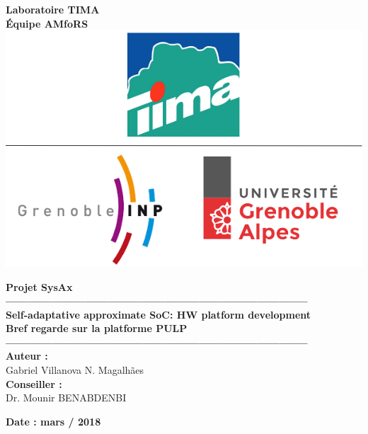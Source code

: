 \begin{titlepage}
\begin{center}
\textbf{\Large Laboratoire TIMA}\\[0.3cm] 
\textbf{\large Équipe AMfoRS}\\[0.1cm]
\vspace{20pt}
\includegraphics[scale=0.4]{../images/capa-tima.png}\\[1cm]

\par
\vspace{20pt}
\textbf{\LARGE Projet SysAx}\\
\vspace{15pt}
\textbf{--------------------------------------------------------------------------------}\\
\textbf{\large Self-adaptative approximate SoC: HW platform development}\\
\vspace{15pt}
\textbf{\Large Bref regarde sur la platforme PULP}\\
\textbf{--------------------------------------------------------------------------------}\\
\vspace{35pt}
\textbf{\large Auteur :}\\[0.1cm]
Gabriel Villanova N. Magalhães\\

\vspace{45pt}
\textbf {\large Conseiller :}\\[0.2cm]
\Large {Dr. Mounir BENABDENBI}\\[0.1cm]
\end{center}

\par
\vfill
\begin{center}
\textbf{Date : mars / 2018	}\\
\end{center}

\end{titlepage}